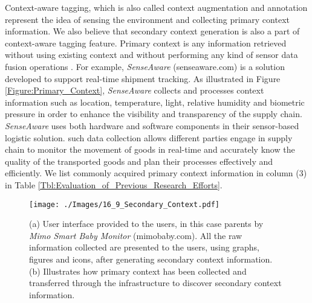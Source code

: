 \documentclass[journal]{IEEEtran}
\begin{document}
Context-aware tagging, which is also called context augmentation and annotation represent the idea of sensing the environment and collecting primary context information. We also believe that secondary context generation is also a part of context-aware tagging feature. Primary context is any information retrieved without using existing  context and without performing any kind of sensor  data fusion operations \cite{ZMP007}.  For example, \textit{SenseAware} (senseaware.com) is a solution developed to support real-time shipment tracking. As illustrated in Figure \ref{Figure:Primary_Context}, \textit{SenseAware} collects and processes context information such as location, temperature, light, relative humidity and biometric pressure  in order to enhance the visibility and transparency of the supply chain.  \textit{SenseAware} uses both hardware and software components in their sensor-based logistic solution. such  data collection allows different parties engage in supply chain to monitor the movement of goods in real-time and accurately know the quality of the transported goods and plan their processes effectively and efficiently. We list commonly acquired primary context information in column (3) in Table \ref{Tbl:Evaluation_of_Previous_Research_Efforts}.




 
    \begin{figure}[!b]
     \centering
     \vspace{-0.43cm}
     \texttt{[image: ./Images/16\_9\_Secondary\_Context.pdf]}
\caption{(a) User interface provided to the users, in this case parents by \textit{Mimo Smart Baby Monitor} (mimobaby.com). All the raw information collected are presented to the users, using graphs, figures and icons, after generating secondary context information. (b) Illustrates how primary context has been collected and transferred through the infrastructure to discover secondary context information.}
     \label{Figure:Secondary_Context}	
\end{figure}
 
\end{document}
